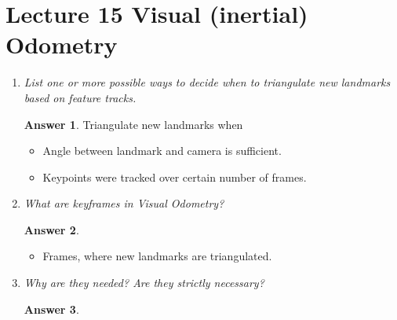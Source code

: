 \documentclass[a4paper,12 pt]{article}
\theoremstyle{definition}
\theoremstyle{remark}
\theoremstyle{definition}
\theoremstyle{definition}
\theoremstyle{definition}
\theoremstyle{definition}
\theoremstyle{remark}
\theoremstyle{remark}
\theoremstyle{definition}
\theoremstyle{definition}
\newtheorem*{answer}{Answer}
\begin{document}
\section*{Lecture 15 Visual (inertial) Odometry}
\begin{enumerate}
\item \textit{List one or more possible ways to decide when to triangulate new landmarks based on feature tracks.}
\begin{answer}
Triangulate new landmarks when
\begin{itemize}
\item Angle between landmark and camera is sufficient.
\item Keypoints were tracked over certain number of frames.
\end{itemize}
\end{answer}
\item \textit{What are keyframes in Visual Odometry? }
\begin{answer}
\
\begin{itemize}
\item Frames, where new landmarks are triangulated.
\end{itemize}
\end{answer}
\item \textit{Why are they needed? Are they strictly necessary?}
\begin{answer}
\
\begin{itemize}


\end{itemize}
\end{answer}
\end{enumerate}
\end{document}
